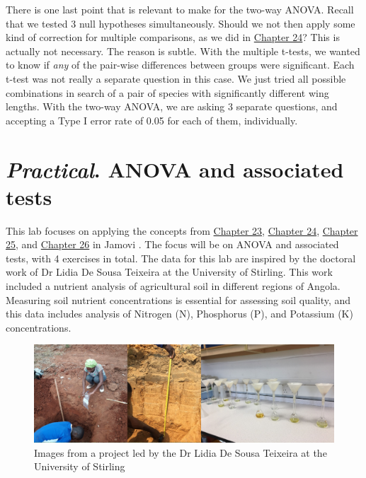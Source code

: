 \documentclass[
]{scrbook}
\begin{document}
There is one last point that is relevant to make for the two-way ANOVA.
Recall that we tested 3 null hypotheses simultaneously.
Should we not then apply some kind of correction for multiple comparisons, as we did in \protect\hyperlink{Chapter_24}{Chapter 24}?
This is actually not necessary.
The reason is subtle.
With the multiple t-tests, we wanted to know if \emph{any} of the pair-wise differences between groups were significant.
Each t-test was not really a separate question in this case.
We just tried all possible combinations in search of a pair of species with significantly different wing lengths.
With the two-way ANOVA, we are asking 3 separate questions, and accepting a Type I error rate of 0.05 for each of them, individually.

\hypertarget{Chapter_27}{%
\chapter{\texorpdfstring{\emph{Practical}. ANOVA and associated tests}{Practical. ANOVA and associated tests}}\label{Chapter_27}}

This lab focuses on applying the concepts from \protect\hyperlink{Chapter_23}{Chapter 23}, \protect\hyperlink{Chapter_24}{Chapter 24}, \protect\hyperlink{Chapter_25}{Chapter 25}, and \protect\hyperlink{Chapter_17}{Chapter 26} in Jamovi \citep{Jamovi2022}.
The focus will be on ANOVA and associated tests, with 4 exercises in total.
The data for this lab are inspired by the doctoral work of Dr Lidia De Sousa Teixeira at the University of Stirling.
This work included a nutrient analysis of agricultural soil in different regions of Angola.
Measuring soil nutrient concentrations is essential for assessing soil quality, and this data includes analysis of Nitrogen (N), Phosphorus (P), and Potassium (K) concentrations.

\begin{figure}
\includegraphics[width=1\linewidth]{img/lidia_project} \caption{Images from a project led by the Dr Lidia De Sousa Teixeira at the University of Stirling}\label{fig:unnamed-chunk-125}
\end{figure}
\end{document}
